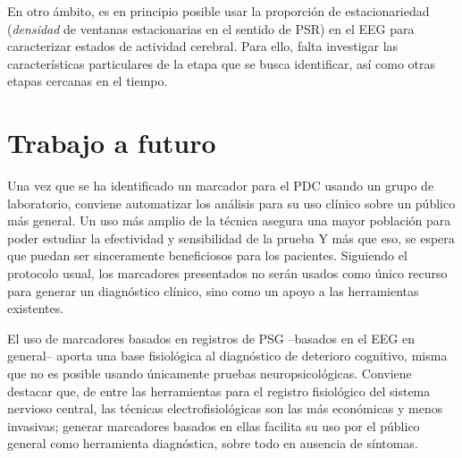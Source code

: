 En otro ámbito, es en principio posible usar la
proporción de estacionariedad (\textit{densidad} de ventanas estacionarias en el sentido de
PSR) en el EEG para caracterizar estados de actividad cerebral. Para ello, falta 
investigar las características particulares de la etapa que se busca identificar, así como otras
etapas cercanas en el tiempo.


\section{Trabajo a futuro}

Una vez que se ha identificado un marcador para el PDC usando un grupo de laboratorio,
conviene automatizar los análisis para su uso clínico sobre un público más general.
%
Un uso más amplio de la técnica asegura una mayor población para poder estudiar la 
efectividad y sensibilidad de la prueba
Y más que eso, se espera que puedan ser sinceramente beneficiosos para los pacientes. Siguiendo el
protocolo usual, los marcadores presentados no serán usados como único recurso para generar
un diagnóstico clínico, sino como un apoyo a las herramientas existentes.

El uso de marcadores basados en registros de PSG --basados en el EEG en general-- aporta una
base fisiológica al diagnóstico de deterioro cognitivo, misma que no es posible usando
únicamente pruebas neuropsicológicas.
%
Conviene destacar que, de entre las herramientas para el registro fisiológico del sistema nervioso
central, las técnicas electrofisiológicas son las más económicas y menos invasivas;
generar marcadores basados en ellas facilita su uso por el público general como herramienta 
diagnóstica, sobre todo en ausencia de síntomas.

